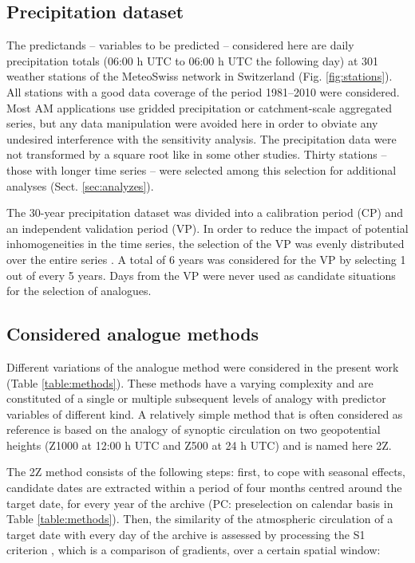 \documentclass{ametsoc}
\begin{document}
\subsection{Precipitation dataset}
\label{sec:precip}

The predictands -- variables to be predicted -- considered here are daily precipitation totals (06:00 h UTC to 06:00 h UTC the following day) at 301 weather stations of the MeteoSwiss network in Switzerland (Fig. \ref{fig:stations}). All stations with a good data coverage of the period 1981--2010 were considered. Most AM applications use gridded precipitation or catchment-scale aggregated series, but any data manipulation were avoided here in order to obviate any undesired interference with the sensitivity analysis. The precipitation data were not transformed by a square root like in some other studies. Thirty stations -- those with longer time series -- were selected among this selection for additional analyses (Sect. \ref{sec:analyzes}).

The 30-year precipitation dataset was divided into a calibration period (CP) and an independent validation period (VP). In order to reduce the impact of potential inhomogeneities in the time series, the selection of the VP was evenly distributed over the entire series \citep{BenDaoud2010}. A total of 6 years was considered for the VP by selecting 1 out of every 5 years. Days from the VP were never used as candidate situations for the selection of analogues.


\subsection{Considered analogue methods}
\label{sec:ams}

Different variations of the analogue method were considered in the present work (Table \ref{table:methods}). These methods have a varying complexity and are constituted of a single or multiple subsequent levels of analogy with predictor variables of different kind. A relatively simple method that is often considered as reference is based on the analogy of synoptic circulation on two geopotential heights (Z1000 at 12:00 h UTC and Z500 at 24 h UTC) and is named here 2Z.

The 2Z method consists of the following steps: first, to cope with seasonal effects, candidate dates are extracted within a period of four months centred around the target date, for every year of the archive (PC: preselection on calendar basis in Table \ref{table:methods}). Then, the similarity of the atmospheric circulation of a target date with every day of the archive is assessed by processing the S1 criterion \citep[Eq.\ \ref{eq:S1}, ][]{Teweles1954, Drosdowsky2003}, which is a comparison of gradients, over a certain spatial window:
\end{document}

